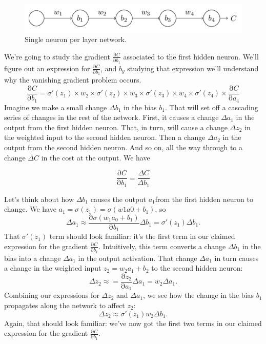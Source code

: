 \documentclass[12pt, letterpaper]{article}
\theoremstyle{definition}
\newcommand{\pr}{\mathrm{\partial}}
\begin{document}
\begin{figure}
\centering
\includegraphics[scale=0.5]{img/singleNeuronNetwork}
\caption{Single neuron per layer network.}
\label{singleNeuronNetwork}
\end{figure}
We're going to study the gradient $\frac{\pr C}{\pr b_1}$ associated to the first hidden neuron. We'll figure out an expression for $\frac{\pr C}{\pr b_1}$, and $b_y$ studying that expression we'll understand why the vanishing gradient problem occurs.
\begin{equation}
\frac{\pr C}{\pr b_1} = \sigma'(z_1) \times w_2 \times \sigma'(z_2)\times w_3 \times \sigma'(z_3) \times w_4 \times \sigma'(z_4) \times \frac{\pr C}{\pr a_4}
\end{equation}
Imagine we make a small change $\Delta b_1$ in the bias $b_1$. That will set off a cascading series of changes in the rest of the network. First, it causes a change $\Delta a_1$ in the output from the first hidden neuron. That, in turn, will cause a change $\Delta z_2$ in the weighted input to the second hidden neuron. Then a change $\Delta a_2$ in the output from the second hidden neuron. And so on, all the way through to a change $\Delta C$ in the cost at the output. We have

\begin{equation}
\frac{\pr C}{\pr b_1} = \frac{\Delta C}{\Delta b_1}
\end{equation}

Let's think about how $\Delta b_1$ causes the output $a_1 $from the first hidden neuron to change. We have $a_1=\sigma(z_1)=\sigma(w1a0+b_1)$, so 
\begin{equation}
\Delta a_1\approx \frac{\pr \sigma(w_1a_0+b_1)}{\pr b_1}\Delta b_1 = \sigma'(z_1)\Delta b_1. 
\end{equation}
That $\sigma'(z_1)$ term should look familiar: it's the first term in our claimed expression for the gradient $\frac{\pr C}{\pr b_1}$. Intuitively, this term converts a change $\Delta b_1$ in the bias into a change $\Delta a_1$ in the output activation. That change $\Delta a_1$ in turn causes a change in the weighted input $z_2=w_2a_1+b_2$ to the second hidden neuron:
\begin{equation}
\Delta z_2\approx=\frac{\pr z_2}{\pr a_1} \Delta a_1 = w_2\Delta a_1.
\end{equation}
Combining our expressions for $\Delta z_2$ and $\Delta a_1$, we see how the change in the bias $b_1$ propagates along the network to affect $z_2$:
\begin{equation}
\Delta z_2\approx\sigma'(z_1)w_2\Delta b_1.
\end{equation}
Again, that should look familiar: we've now got the first two terms in our claimed expression for the gradient $\frac{\pr C}{\pr b_1}$.
\end{document}
